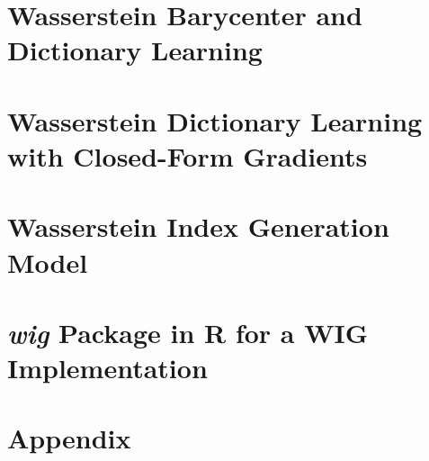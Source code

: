 \documentclass[oneside,12pt,letterpaper]{article}
\begin{document}
\section[Barycenter and Dictionary]{Wasserstein Barycenter and Dictionary Learning}\label{sec:wasserstein-barycenter-and-dictionary-learning}


\section[WDL]{Wasserstein Dictionary Learning with Closed-Form Gradients}\label{sec:wdl-gradient}


\section[WIG Model]{Wasserstein Index Generation Model}\label{sec:wig-model}
\citet{xie2020}

\section[\textbf{\texorpdfstring{\MakeLowercase{wig}}{wig}} Package]{\textbf{\textit{wig}} Package in R for a WIG Implementation}\label{sec:wig-package}

\citet{xie2020a}


% 

\newpage
{}
\printbibliography

\newpage
\section*{Appendix}
\appendix
\setcounter{secnumdepth}{0}


\end{document}
